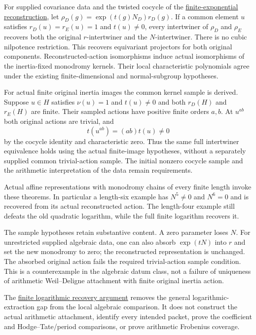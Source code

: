 \documentclass[11pt]{article}
\theoremstyle{definition}
\theoremstyle{remark}
\begin{document}
For supplied covariance data and the twisted cocycle of the \hyperref[book:x-construction-13]{finite-exponential reconstruction}, let
$\rho_D(g)=\exp(t(g)N_D)r_D(g)$. If a common element $u$ satisfies
$r_D(u)=r_E(u)=1$ and $t(u)\ne0$, every intertwiner of $\rho_D$ and
$\rho_E$ recovers both the original $r$-intertwiner and the $N$-intertwiner.
There is no cubic nilpotence restriction. This recovers equivariant
projectors for both original components. Reconstructed-action isomorphisms
induce actual isomorphisms of the inertia-fixed monodromy kernels. Their local characteristic polynomials
agree under the existing finite-dimensional and normal-subgroup hypotheses.

For actual finite original inertia images the common kernel sample is
derived. Suppose $u\in H$ satisfies $\nu(u)=1$ and $t(u)\ne0$ and both
$r_D(H)$ and $r_E(H)$ are finite. Their sampled actions have positive
finite orders $a,b$. At $u^{ab}$ both original actions are trivial, and
\[
t(u^{ab})=(ab)t(u)\ne0
\]
by the cocycle identity and characteristic zero. Thus the same full
intertwiner equivalence holds using the actual finite-image hypotheses,
without a separately supplied common trivial-action sample. The initial
nonzero cocycle sample and the arithmetic interpretation of the data
remain requirements.

Actual affine representations with monodromy chains of every finite
length invoke these theorems. In particular a length-six example has
$N^5\ne0$ and $N^6=0$ and is recovered from its actual reconstructed action.
The length-four example still defeats the old quadratic logarithm, while
the full finite logarithm recovers it.

The sample hypotheses retain substantive content. A zero parameter loses
$N$. For unrestricted supplied algebraic data, one can also absorb
$\exp(tN)$ into $r$ and set the new monodromy to zero; the reconstructed
representation is unchanged. The absorbed original action fails the
required trivial-action sample condition. This is a counterexample in the
algebraic datum class, not a failure of uniqueness of arithmetic
Weil--Deligne attachment with finite original inertia action.

The \hyperref[book:x-construction-20]{finite logarithmic recovery argument} removes the general logarithmic-extraction gap from the local
algebraic comparison. It does not construct the actual arithmetic
attachment, identify every intended packet, prove the coefficient and
Hodge--Tate/period comparisons, or prove arithmetic Frobenius coverage.
\end{document}
